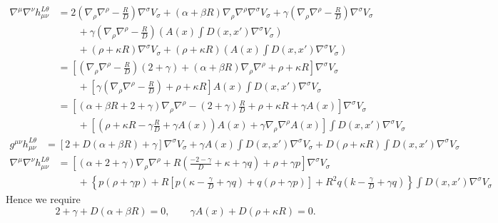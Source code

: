 \documentclass[10pt,letterpaper]{article}
\begin{document}
\begin{align}
\nabla^\mu \nabla^\nu h_{\mu\nu}^{L\theta} &= 2\left( \nabla_\rho \nabla^\rho- \frac{R}{D}\right) \nabla^\sigma V_\sigma
+(\alpha+\beta R) \nabla_\rho \nabla^\rho \nabla^\sigma V_\sigma + \gamma \left(\nabla_\rho \nabla^\rho-\frac{R}{D}\right) \nabla^\sigma V_\sigma 
\nonumber \\ 
&\qquad 
+\gamma\left(\nabla_\rho \nabla^\rho-\frac{R}{D}\right)  \left( A(x) \int D(x,x') \nabla^\sigma V_\sigma \right) 
\nonumber\\
&\qquad
+(\rho + \kappa R) \nabla^\sigma V_\sigma + (\rho+\kappa R) \left( A(x) \int D(x,x')\nabla^\sigma V_\sigma\right)
\nonumber\\
&= \left[ \left(\nabla_\rho \nabla^\rho - \frac{R}{D}\right)(2+\gamma) + (\alpha +\beta R)\nabla_\rho \nabla^\rho + \rho +\kappa R\right]\nabla^\sigma V_\sigma
\nonumber\\
&\qquad + \left[\gamma\left(\nabla_\rho \nabla^\rho -\frac{R}{D}\right) + \rho+\kappa R\right]  A(x) \int D(x,x')\nabla^\sigma V_\sigma
\nonumber\\
&= \left[ (\alpha +\beta R +2+\gamma)\nabla_\rho \nabla^\rho -(2+\gamma)\frac{R}{D} + \rho+\kappa R+\gamma A(x)\right] \nabla^\sigma V_\sigma
\nonumber \\
&\qquad +\left[  \left(\rho +\kappa R -\gamma \frac{R}{D} + \gamma A(x)\right) A(x) + \gamma \nabla_\rho \nabla^\rho A(x)\right] \int D(x,x')\nabla^\sigma V_\sigma
\end{align}
\begin{align}
g^{\mu\nu}h_{\mu\nu}^{L\theta} &= \left[ 2 + D(\alpha +\beta R) + \gamma\right] \nabla^\sigma V_\sigma 
+\gamma A(x) \int D(x,x') \nabla^\sigma V_\sigma + D(\rho +\kappa R)\int D(x,x') \nabla^\sigma V_\sigma
\end{align}
\begin{align}
\nabla^\mu \nabla^\nu h_{\mu\nu}^{L\theta} &= \left[
(\alpha + 2 +\gamma) \nabla_\rho \nabla^\rho + R \left( \frac{-2 - \gamma}{D} +\kappa + \gamma q \right) +\rho+\gamma p\right] \nabla^\sigma V_\sigma
\nonumber\\
&\qquad + \left\{ p(\rho +\gamma p) + R\left[ p(\kappa-\frac{\gamma}{D} + \gamma q)+q(\rho+\gamma p)\right] + R^2 q\left( k - \frac{\gamma}{D} + \gamma q\right)\right\} \int D(x,x') \nabla^\sigma V_\sigma
\end{align}
Hence we require
\begin{equation}
2+\gamma + D(\alpha +\beta R) = 0,\qquad \gamma A(x) + D(\rho +\kappa R) = 0.
\end{equation}
\end{document}
